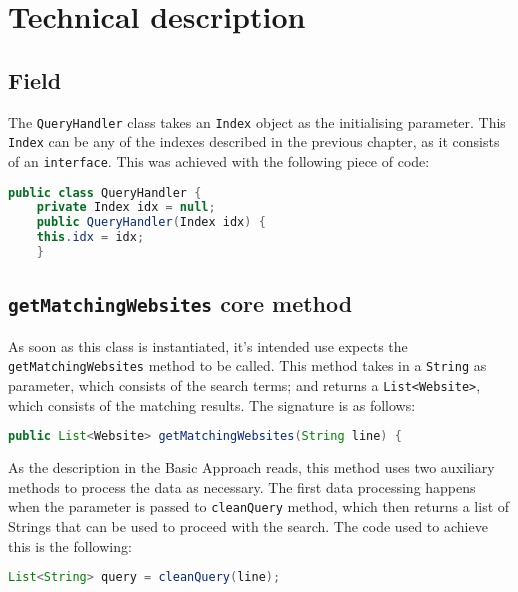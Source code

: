 \section{Technical description} %
\subsection{Field}
The {\tt QueryHandler} class takes an {\tt Index} object as the initialising parameter. This {\tt Index} can be any of the indexes described in the previous chapter, as it consists of an {\tt interface}. This was achieved with the following piece of code:
\begin{lstlisting}[language=Java]
public class QueryHandler {
    private Index idx = null;
    public QueryHandler(Index idx) {
    this.idx = idx;
    }
\end{lstlisting}
\subsection{{\tt getMatchingWebsites} core method}
As soon as this class is instantiated, it's intended use expects the {\tt getMatchingWebsites} method to be called. This method takes in a {\tt String} as parameter, which consists of the search terms; and returns a {\tt List<Website>}, which consists of the matching results. The signature is as follows:
\begin{lstlisting}[language=Java]
public List<Website> getMatchingWebsites(String line) {
\end{lstlisting}
As the description in the Basic Approach reads, this method uses two auxiliary methods to process the data as necessary. The first data processing happens when the parameter is passed to {\tt cleanQuery} method, which then returns a list of Strings that can be used to proceed with the search. The code used to achieve this is the following:
\begin{lstlisting}[language=Java]
List<String> query = cleanQuery(line);
\end{lstlisting}
